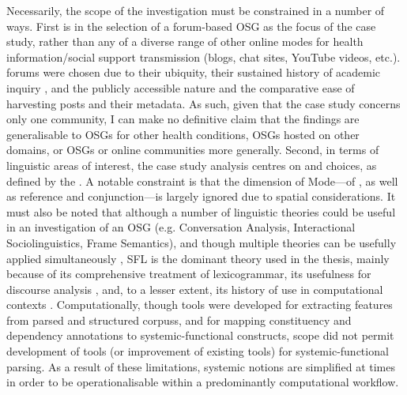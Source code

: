 Necessarily, the scope of the investigation must be constrained in a number of ways. First is in the selection of a \gls{forum}\hyp{}based \gls{OSG} as the focus of the case study, rather than any of a diverse range of other online \glspl{mode} for health information\slash social support transmission (blogs, chat sites, YouTube videos, etc.). \Glspl{forum} were chosen due to their ubiquity, their sustained history of academic inquiry \cite{kim_process_2012,sillence_why_2013}, and the publicly accessible nature and the comparative ease of harvesting \glspl{post} and their metadata. As such, given that the case study concerns only one community, I can make no definitive claim that the findings are generalisable to \glspl{OSG} for other health conditions, \glspl{OSG} hosted on other domains, or \glspl{OSG} or online communities more generally.
Second, in terms of linguistic areas of interest, the case study analysis centres on  and  choices, as defined by the  \cite[as in][]{halliday_introduction_2004}. A notable constraint is that the dimension of \gls{Mode}---of , as well as reference and conjunction---is largely ignored due to spatial considerations. It must also be noted that although a number of linguistic theories could be useful in an investigation of an \gls{OSG} (e.g. Conversation Analysis, Interactional Sociolinguistics, Frame Semantics), and though multiple theories can be usefully applied simultaneously \cite{eggins_analysing_2004}, \gls{SFL} is the dominant theory used in the thesis, mainly because of its comprehensive treatment of \gls{lexicogrammar}, its usefulness for discourse analysis \cite{widdowson_limitations_2000}, and, to a lesser extent, its history of use in computational contexts \cite[see][]{odonnell_sfl_2005}. Computationally, though tools were developed for extracting features from parsed and structured \glspl{corpus}, and for mapping constituency and dependency annotations to systemic\hyp{}functional constructs, scope did not permit development of tools (or improvement of existing tools) for systemic\hyp{}functional parsing. As a result of these limitations, systemic notions are simplified at times in order to be operationalisable within a predominantly computational workflow. 

